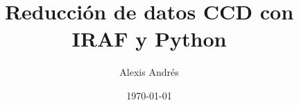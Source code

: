 \documentclass[11pt, letterpaper]{report}
\title{\bf\Huge Reducción de datos CCD con IRAF y Python}
\author{Alexis Andrés}
\date{\today}
\begin{document}
\renewcommand*\thepart{\arabic{part}}
\renewcommand{\partname}{Unidad}
\renewcommand{\chaptername}{Clase}
\renewcommand{\tablename}{Tabla}

\maketitle

\tableofcontents



\end{document}
